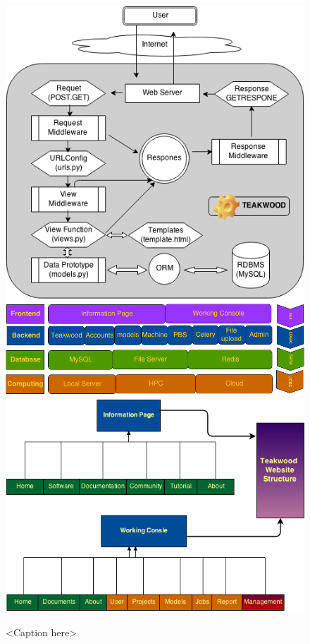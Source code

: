 \begin{figure}[htb]
\centering
\includegraphics[scale=0.8]{./http_request_response}
\includegraphics[scale=0.5]{./system_structure} 
\includegraphics[scale=0.7]{./website_structure} %
\caption{<Caption here>}
\label{fig:label} %
\end{figure}

